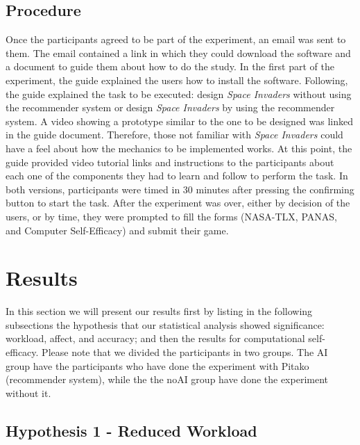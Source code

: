 \documentclass[letterpaper]{article} %
\begin{document}
\subsection{Procedure}
Once the participants agreed to be part of the experiment, an email was sent to them. The email contained a link in which they could download the software and a document to guide them about how to do the study. In the first part of the experiment, the guide explained the users how to install the software. Following, the guide explained the task to be executed: design \textit{Space Invaders} without using the recommender system or design \textit{Space Invaders} by using the recommender system. A video showing a prototype similar to the one to be designed was linked in the guide document. Therefore, those not familiar with \textit{Space Invaders} could have a feel about how the mechanics to be implemented works.
At this point, the guide provided video tutorial links and instructions to the participants about each one of the components they had to learn and follow to perform the task. In both versions, participants were timed in 30 minutes after pressing the confirming button to start the task.
After the experiment was over, either by decision of the users, or by time, they were prompted to fill the forms (NASA-TLX, PANAS, and Computer Self-Efficacy) and submit their game.

\section{Results}

In this section we will present our results first by listing in the following subsections the hypothesis that our statistical analysis showed significance: workload, affect, and accuracy; and then the results for computational self-efficacy. Please note that we divided the participants in two groups. The AI group have the participants who have done the experiment with Pitako (recommender system), while the the noAI group have done the experiment without it.

\subsection{Hypothesis 1 - Reduced Workload}
\end{document}

